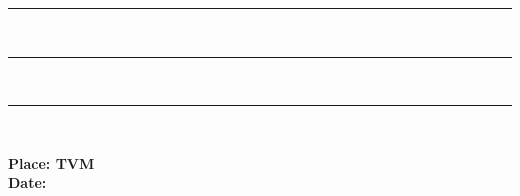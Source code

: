 	\centering
	\begin{minipage}[t]{.3\textwidth}
		\centering

\hrule 
\vspace{0.28\baselineskip}
{\bf \Supervisor \\ \SupervisorPosition} \par
{} 
	\end{minipage}%
	\begin{minipage}[t]{0.3\textwidth}
	
\centering
\hrule 
\vspace{0.28\baselineskip}
{\bf \Supervisora\\ \SupervisorPositiona} \par
{}
	\end{minipage}%
	\begin{minipage}[t]{0.3\textwidth}
		\centering
		\hrule 
	\vspace{0.28\baselineskip}
	{\bf \Supervisorb\\ \SupervisorPositionb} \par
		
	\end{minipage}
\vspace{3\baselineskip}
\begin{flushleft}
	\begin{minipage}[t]{0.33\textwidth}
		{\bf Place: TVM \\}
		{\bf Date: \reportSubmissionDate}
	\end{minipage}
\end{flushleft}
